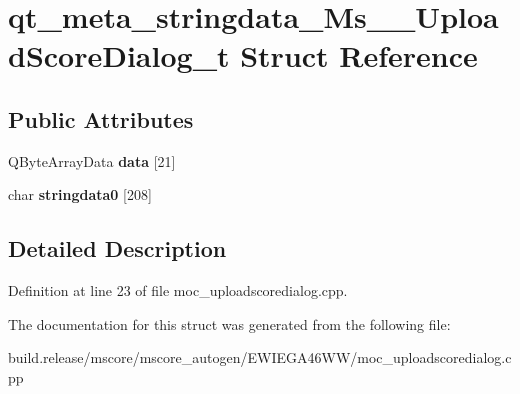 \hypertarget{structqt__meta__stringdata___ms_____upload_score_dialog__t}{}\section{qt\+\_\+meta\+\_\+stringdata\+\_\+\+Ms\+\_\+\+\_\+\+Upload\+Score\+Dialog\+\_\+t Struct Reference}
\label{structqt__meta__stringdata___ms_____upload_score_dialog__t}
\subsection*{Public Attributes}
\begin{DoxyCompactItemize}
\item 
\mbox{\label{structqt__meta__stringdata___ms_____upload_score_dialog__t_a407363befc54faa6d58c8e8b1c5a0bfb}} 
Q\+Byte\+Array\+Data {\bfseries data} \mbox{[}21\mbox{]}
\item 
\mbox{\label{structqt__meta__stringdata___ms_____upload_score_dialog__t_a27cdb49771f8197b0712de43e6441f70}} 
char {\bfseries stringdata0} \mbox{[}208\mbox{]}
\end{DoxyCompactItemize}


\subsection{Detailed Description}


Definition at line 23 of file moc\+\_\+uploadscoredialog.\+cpp.



The documentation for this struct was generated from the following file\+:\begin{DoxyCompactItemize}
\item 
build.\+release/mscore/mscore\+\_\+autogen/\+E\+W\+I\+E\+G\+A46\+W\+W/moc\+\_\+uploadscoredialog.\+cpp\end{DoxyCompactItemize}
